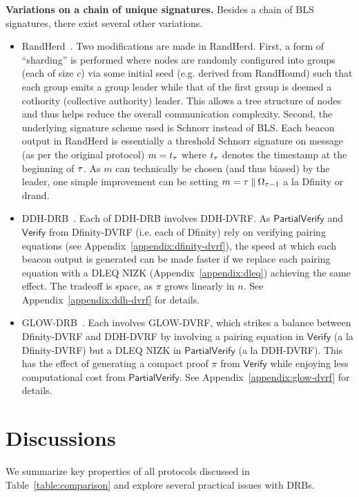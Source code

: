 \noindent\textbf{Variations on a chain of unique signatures.} Besides a chain of BLS signatures, there exist several other variations.
\begin{itemize}
\item RandHerd~\cite{syta2017scalable}. Two modifications are made in RandHerd. First, a form of ``sharding'' is performed where nodes are randomly configured into groups (each of size $c$) via some initial seed (e.g. derived from RandHound) such that each group emits a group leader while that of the first group is deemed a cothority (collective authority) leader. This allows a tree structure of nodes and thus helps reduce the overall communication complexity. Second, the underlying signature scheme used is Schnorr instead of BLS. Each beacon output in RandHerd is essentially a threshold Schnorr signature on message (as per the original protocol) $m = t_\tau$ where $t_\tau$ denotes the timestamp at the beginning of \epoch $\tau$. As $m$ can technically be chosen (and thus biased) by the leader, one simple improvement can be setting $m = \tau \mathbin\Vert \Omega_{\tau - 1}$ a la Dfinity or drand.
\item DDH-DRB~\cite{galindo2020fully}. Each \epoch of DDH-DRB involves DDH-DVRF. As $\mathsf{PartialVerify}$ and $\mathsf{Verify}$ from Dfinity-DVRF (i.e. each \epoch of Dfinity) rely on verifying pairing equations (see Appendix~\ref{appendix:dfinity-dvrf}), the speed at which each beacon output is generated can be made faster if we replace each pairing equation with a DLEQ NIZK (Appendix~\ref{appendix:dleq}) achieving the same effect. The tradeoff is space, as $\pi$ grows linearly in $n$. See Appendix~\ref{appendix:ddh-dvrf} for details.
\item GLOW-DRB~\cite{galindo2020fully}. Each \epoch involves GLOW-DVRF, which strikes a balance between Dfinity-DVRF and DDH-DVRF by involving a pairing equation in $\mathsf{Verify}$ (a la Dfinity-DVRF) but a DLEQ NIZK in $\mathsf{PartialVerify}$ (a la DDH-DVRF). This has the effect of generating a compact proof $\pi$ from $\mathsf{Verify}$ while enjoying less computational cost from $\mathsf{PartialVerify}$. See Appendix~\ref{appendix:glow-dvrf} for details.
\end{itemize}

\section{Discussions}
\label{section:discussions}
We summarize key properties of all protocols discussed in Table~\ref{table:comparison} and explore several practical issues with DRBs.

